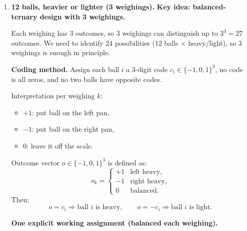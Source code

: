 \documentclass[11pt]{article}
\begin{document}
\begin{enumerate}[label=\textbf{\arabic*.}]
So the only candidates for positions 2 and 3 overall are:
\[
\{A_2,A_3,B_1,B_2,C_1\}.
\]
(\(A_1\) is already known to be the overall fastest.)

\medskip
\noindent\textbf{Step 3 (7th race):} Race these 5 candidates. The top two finishers from this race, together with \(A_1\), are the overall top 3.

\medskip
Thus \(\boxed{7}\) races suffice.

\medskip
\noindent\textbf{Why 6 races cannot guarantee it?}  
After 6 races you typically still have at least 5 plausible candidates for ranks 2 and 3, and without a 7th race you cannot fully order them. (This is the classic lower-bound argument in this puzzle.)

\hfill{\small\textit{Ref: A Practical Guide, Ch.\ 2, ``Horse race''}}

\item \textbf{12 balls, heavier or lighter (3 weighings).}
\textbf{Key idea: balanced-ternary design with 3 weighings.}

Each weighing has 3 outcomes, so 3 weighings can distinguish up to \(3^3=27\) outcomes.
We need to identify 24 possibilities (12 balls $\times$ heavy/light), so 3 weighings is enough in principle.

\medskip
\noindent\textbf{Coding method.}
Assign each ball \(i\) a 3-digit code \(c_i\in\{-1,0,1\}^3\), no code is all zeros, and no two balls have opposite codes.

Interpretation per weighing \(k\):
\begin{itemize}
\item \(+1\): put ball on the left pan,
\item \(-1\): put ball on the right pan,
\item \(0\): leave it off the scale.
\end{itemize}
Outcome vector \(o\in\{-1,0,1\}^3\) is defined as:
\[
o_k=
\begin{cases}
+1 & \text{left heavy},\\
-1 & \text{right heavy},\\
0 & \text{balanced}.
\end{cases}
\]
Then:
\[
o=c_i \Rightarrow \text{ball }i\text{ is heavy},\qquad
o=-c_i \Rightarrow \text{ball }i\text{ is light}.
\]

\medskip
\noindent\textbf{One explicit working assignment (balanced each weighing).}


\end{enumerate}
\end{document}
